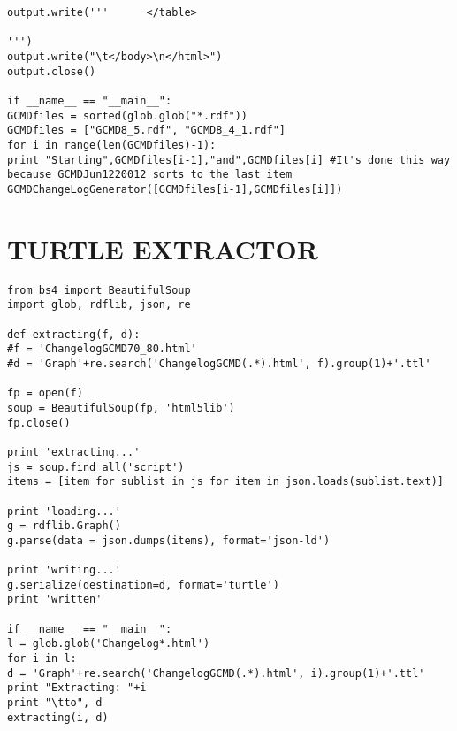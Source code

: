 \begin{verbatim}
output.write('''      </table>

''')
output.write("\t</body>\n</html>")
output.close()

if __name__ == "__main__":
GCMDfiles = sorted(glob.glob("*.rdf"))
GCMDfiles = ["GCMD8_5.rdf", "GCMD8_4_1.rdf"]
for i in range(len(GCMDfiles)-1):
print "Starting",GCMDfiles[i-1],"and",GCMDfiles[i] #It's done this way because GCMDJun1220012 sorts to the last item
GCMDChangeLogGenerator([GCMDfiles[i-1],GCMDfiles[i]])
\end{verbatim}

\chapter{TURTLE EXTRACTOR}
\begin{verbatim}
from bs4 import BeautifulSoup
import glob, rdflib, json, re

def extracting(f, d):
#f = 'ChangelogGCMD70_80.html'
#d = 'Graph'+re.search('ChangelogGCMD(.*).html', f).group(1)+'.ttl'

fp = open(f)
soup = BeautifulSoup(fp, 'html5lib')
fp.close()

print 'extracting...'
js = soup.find_all('script')
items = [item for sublist in js for item in json.loads(sublist.text)]

print 'loading...'
g = rdflib.Graph()
g.parse(data = json.dumps(items), format='json-ld')

print 'writing...'
g.serialize(destination=d, format='turtle')
print 'written'

if __name__ == "__main__":
l = glob.glob('Changelog*.html')
for i in l:
d = 'Graph'+re.search('ChangelogGCMD(.*).html', i).group(1)+'.ttl'
print "Extracting: "+i
print "\tto", d
extracting(i, d)
\end{verbatim}

